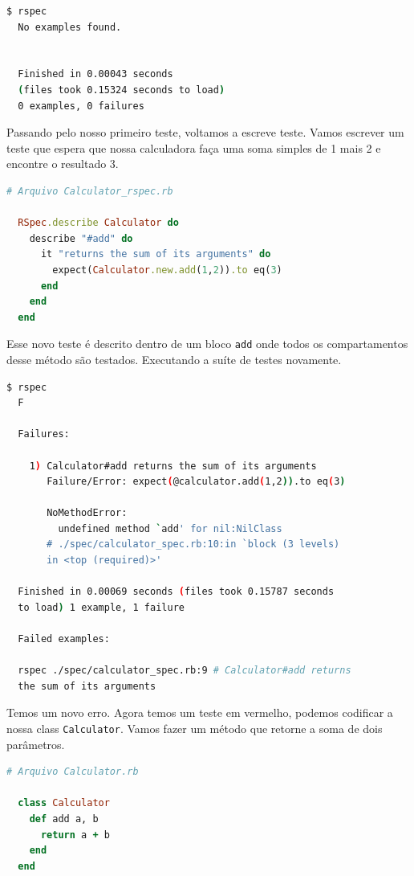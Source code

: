 \documentclass[12pt]{article}
\newcommand{\code}[1]{\texttt{#1}}
\begin{document}
  \begin{lstlisting}[language=bash]
  $ rspec
  No examples found.


  Finished in 0.00043 seconds 
  (files took 0.15324 seconds to load)
  0 examples, 0 failures
  \end{lstlisting}

  Passando pelo nosso primeiro teste, voltamos a escreve teste. Vamos escrever
  um teste que espera que nossa calculadora faça uma soma simples de 1 mais 2
  e encontre o resultado 3.

  \begin{lstlisting}[language=Ruby]
  # Arquivo Calculator_rspec.rb

  RSpec.describe Calculator do
    describe "#add" do
      it "returns the sum of its arguments" do
        expect(Calculator.new.add(1,2)).to eq(3)
      end
    end
  end
  \end{lstlisting}

  Esse novo teste é descrito dentro de um bloco \code{add} onde todos os 
  compartamentos desse método são testados. Executando a suíte de testes
  novamente.

  \begin{lstlisting}[language=bash]
  $ rspec
  F

  Failures:

    1) Calculator#add returns the sum of its arguments 
       Failure/Error: expect(@calculator.add(1,2)).to eq(3)
       
       NoMethodError:
         undefined method `add' for nil:NilClass
       # ./spec/calculator_spec.rb:10:in `block (3 levels) 
       in <top (required)>'

  Finished in 0.00069 seconds (files took 0.15787 seconds 
  to load) 1 example, 1 failure

  Failed examples:

  rspec ./spec/calculator_spec.rb:9 # Calculator#add returns 
  the sum of its arguments 
  \end{lstlisting}
  
  Temos um novo erro. Agora temos um teste em vermelho, podemos codificar a
  nossa class \code{Calculator}. Vamos fazer um método que retorne a soma de
  dois parâmetros.

  \begin{lstlisting}[language=Ruby]
  # Arquivo Calculator.rb

  class Calculator
    def add a, b
      return a + b
    end
  end
  \end{lstlisting}
\end{document}
